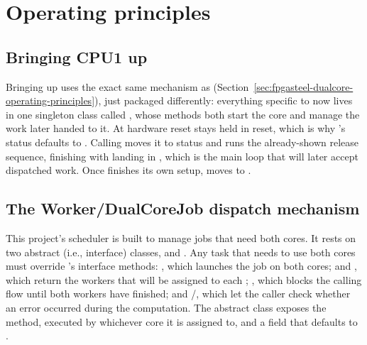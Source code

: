 \section{Operating principles}
\label{sec:fpgasteel-dualcore-forwarding-operating-principles}

\subsection{Bringing CPU1 up}
\label{subsec:fpgasteel-dualcore-forwarding-bringing-cpu1}

Bringing  up uses the exact same mechanism as  (Section~\ref{sec:fpgasteel-dualcore-operating-principles}), just packaged differently: everything specific to  now lives in one singleton class called , whose methods both start the core and manage the work later handed to it. At hardware reset  stays held in reset, which is why 's status defaults to . Calling  moves it to  status and runs the already-shown release sequence, finishing with  landing in , which is the main loop that will later accept dispatched work. Once  finishes its own setup,  moves to .

\subsection{The Worker/DualCoreJob dispatch mechanism}
\label{subsec:fpgasteel-dualcore-forwarding-dispatch}

This project's scheduler is built to manage jobs that need both cores. It rests on two abstract (i.e., interface) classes,  and . Any task that needs to use both cores must override 's interface methods: , which launches the job on both cores;  and , which return the workers that will be assigned to each ; , which blocks the calling flow until both workers have finished; and /, which let the caller check whether an error occurred during the computation. The abstract class  exposes the  method, executed by whichever core it is assigned to, and a  field that defaults to .

